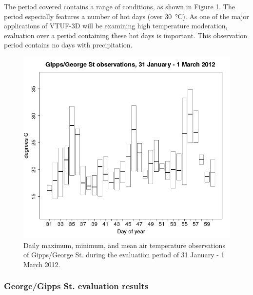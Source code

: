\documentclass[final,3p,times,authoryear]{elsarticle}
\begin{document}
The period covered contains a range of conditions, as shown in Figure \ref{fig:CoMtemp}. The period especially features a number of hot days (over 30\SI{}{\degreeCelsius}). As one of the major applications of VTUF-3D will be examining high temperature moderation, evaluation over a period containing these hot days is important. This observation period contains no days with precipitation.


\begin{figure}[!htbp]
\includegraphics[trim = 0mm 0mm 0mm 0mm, clip, scale=0.30]{images/CoMTempFeb2012.png}
\caption{Daily maximum, minimum, and mean air temperature observations of Gipps/George St. during the evaluation period of 31 January - 1 March 2012.\label{fig:CoMtemp}} 
\end{figure}



\subsubsection{George/Gipps St. evaluation results}
\end{document}
